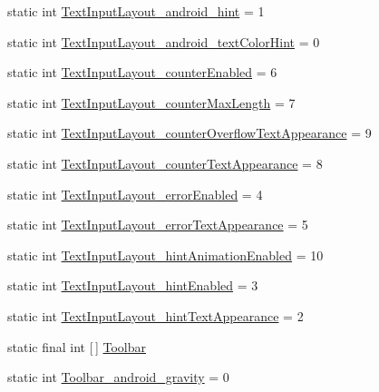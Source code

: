 \begin{DoxyCompactItemize}
static int \hyperlink{classandroid_1_1support_1_1v7_1_1cardview_1_1R_1_1styleable_a7c7f82a17bd73ea16f56f9302939809c}{Text\+Input\+Layout\+\_\+android\+\_\+hint} = 1
\item 
static int \hyperlink{classandroid_1_1support_1_1v7_1_1cardview_1_1R_1_1styleable_ae336304acb8c72b2b3ccc0474f7aad40}{Text\+Input\+Layout\+\_\+android\+\_\+text\+Color\+Hint} = 0
\item 
static int \hyperlink{classandroid_1_1support_1_1v7_1_1cardview_1_1R_1_1styleable_ad750dbff56b0a06f93dd6265ff2d59a8}{Text\+Input\+Layout\+\_\+counter\+Enabled} = 6
\item 
static int \hyperlink{classandroid_1_1support_1_1v7_1_1cardview_1_1R_1_1styleable_a27208f96108863c14673fcbb37b76c90}{Text\+Input\+Layout\+\_\+counter\+Max\+Length} = 7
\item 
static int \hyperlink{classandroid_1_1support_1_1v7_1_1cardview_1_1R_1_1styleable_a96e59cae084e4729e31f7abe43a12b5c}{Text\+Input\+Layout\+\_\+counter\+Overflow\+Text\+Appearance} = 9
\item 
static int \hyperlink{classandroid_1_1support_1_1v7_1_1cardview_1_1R_1_1styleable_a4f48ef46d74bceb992c4f711156a4d5e}{Text\+Input\+Layout\+\_\+counter\+Text\+Appearance} = 8
\item 
static int \hyperlink{classandroid_1_1support_1_1v7_1_1cardview_1_1R_1_1styleable_a8a5e8ed251b3ba0a1edc2d97db3fc83a}{Text\+Input\+Layout\+\_\+error\+Enabled} = 4
\item 
static int \hyperlink{classandroid_1_1support_1_1v7_1_1cardview_1_1R_1_1styleable_a6a9888ab733b8f3bd68a7bcff9190d87}{Text\+Input\+Layout\+\_\+error\+Text\+Appearance} = 5
\item 
static int \hyperlink{classandroid_1_1support_1_1v7_1_1cardview_1_1R_1_1styleable_a421879524a0afb79c7396b3d0a1e6e7e}{Text\+Input\+Layout\+\_\+hint\+Animation\+Enabled} = 10
\item 
static int \hyperlink{classandroid_1_1support_1_1v7_1_1cardview_1_1R_1_1styleable_a5432983a645efe43960a479cb7a7fb22}{Text\+Input\+Layout\+\_\+hint\+Enabled} = 3
\item 
static int \hyperlink{classandroid_1_1support_1_1v7_1_1cardview_1_1R_1_1styleable_a15aeb1e9b65b899047a6cf8619716946}{Text\+Input\+Layout\+\_\+hint\+Text\+Appearance} = 2
\item 
static final int \mbox{[}$\,$\mbox{]} \hyperlink{classandroid_1_1support_1_1v7_1_1cardview_1_1R_1_1styleable_a26149aeb8fd339abe09ecc9d92b9304f}{Toolbar}
\item 
static int \hyperlink{classandroid_1_1support_1_1v7_1_1cardview_1_1R_1_1styleable_a303e5186407298acc48895e58eb6f585}{Toolbar\+\_\+android\+\_\+gravity} = 0

\end{DoxyCompactItemize}
